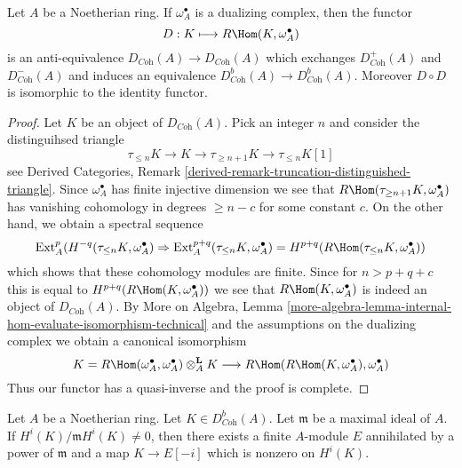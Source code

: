 \begin{lemma}
\label{lemma-dualizing}
Let $A$ be a Noetherian ring. If $\omega_A^\bullet$ is a dualizing
complex, then the functor
$$
D : K \longmapsto R\Hom(K, \omega_A^\bullet)
$$
is an anti-equivalence $D_{\textit{Coh}}(A) \to D_{\textit{Coh}}(A)$
which exchanges $D^+_{\textit{Coh}}(A)$ and $D^-_{\textit{Coh}}(A)$
and induces an equivalence $D^b_{\textit{Coh}}(A) \to D^b_{\textit{Coh}}(A)$.
Moreover $D \circ D$ is isomorphic to the identity functor.
\end{lemma}

\begin{proof}
Let $K$ be an object of $D_{\textit{Coh}}(A)$. Pick an integer $n$ and
consider the distinguihsed triangle
$$
\tau_{\leq n}K \to K \to \tau_{\geq n + 1}K \to \tau_{\leq n}K[1]
$$
see Derived Categories, Remark
\ref{derived-remark-truncation-distinguished-triangle}.
Since $\omega_A^\bullet$ has finite injective dimension we see
that $R\Hom(\tau_{\geq n + 1}K, \omega_A^\bullet)$ has vanishing
cohomology in degrees $\geq n - c$ for some constant $c$.
On the other hand, we obtain a spectral sequence
$$
\text{Ext}_A^p(H^{-q}(\tau_{\leq n}K, \omega_A^\bullet)
\Rightarrow
\text{Ext}_A^{p + q}(\tau_{\leq n}K, \omega_A^\bullet) =
H^{p + q}(R\Hom(\tau_{\leq n}K, \omega_A^\bullet))
$$
which shows that these cohomology modules are finite. Since for
$n > p + q + c$ this is equal to $H^{p + q}(R\Hom(K, \omega_A^\bullet))$
we see that $R\Hom(K, \omega_A^\bullet)$ is indeed an object
of $D_{\textit{Coh}}(A)$.
By More on Algebra, Lemma
\ref{more-algebra-lemma-internal-hom-evaluate-isomorphism-technical}
and the assumptions on the dualizing complex
we obtain a canonical isomorphism
$$
K = R\Hom(\omega_A^\bullet, \omega_A^\bullet) \otimes_A^\mathbf{L} K
\longrightarrow
R\Hom(R\Hom(K, \omega_A^\bullet), \omega_A^\bullet)
$$
Thus our functor has a quasi-inverse and the proof is complete.
\end{proof}

\begin{lemma}
\label{lemma-detect-cohomology}
Let $A$ be a Noetherian ring. Let $K \in D^b_{\textit{Coh}}(A)$.
Let $\mathfrak m$ be a maximal ideal of $A$.
If $H^i(K)/\mathfrak m H^i(K) \not = 0$, then there exists a finite
$A$-module $E$ annihilated by a power of $\mathfrak m$
and a map $K \to E[-i]$ which is nonzero on $H^i(K)$.
\end{lemma}

